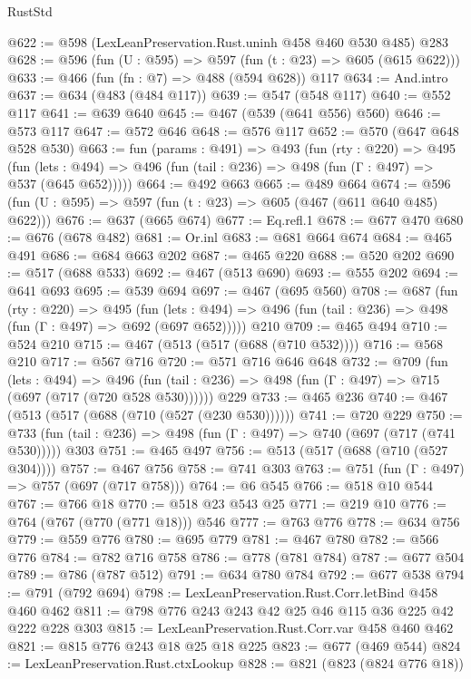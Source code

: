 \begin{lexlean}{RustStd}
\begin{coremodule}
@622 := @598 (LexLeanPreservation.Rust.uninh @458 @460 @530 @485) @283
@628 := @596 (fun (U : @595) => @597 (fun (t : @23) => @605 (@615 @622)))
@633 := @466 (fun (fn : @7) => @488 (@594 @628)) @117
@634 := And.intro
@637 := @634 (@483 (@484 @117))
@639 := @547 (@548 @117)
@640 := @552 @117
@641 := @639 @640
@645 := @467 (@539 (@641 @556) @560)
@646 := @573 @117
@647 := @572 @646
@648 := @576 @117
@652 := @570 (@647 @648 @528 @530)
@663 := fun (params : @491) =>
  @493
    (fun (rty : @220) =>
    @495
      (fun (lets : @494) => @496 (fun (tail : @236) => @498 (fun (Γ : @497) => @537 (@645 @652)))))
@664 := @492 @663
@665 := @489 @664
@674 := @596 (fun (U : @595) => @597 (fun (t : @23) => @605 (@467 (@611 @640 @485) @622)))
@676 := @637 (@665 @674)
@677 := Eq.refl.{1}
@678 := @677 @470
@680 := @676 (@678 @482)
@681 := Or.inl
@683 := @681 @664 @674
@684 := @465 @491
@686 := @684 @663 @202
@687 := @465 @220
@688 := @520 @202
@690 := @517 (@688 @533)
@692 := @467 (@513 @690)
@693 := @555 @202
@694 := @641 @693
@695 := @539 @694
@697 := @467 (@695 @560)
@708 := @687
    (fun (rty : @220) =>
    @495
      (fun (lets : @494) => @496 (fun (tail : @236) => @498 (fun (Γ : @497) => @692 (@697 @652)))))
    @210
@709 := @465 @494
@710 := @524 @210
@715 := @467 (@513 (@517 (@688 (@710 @532))))
@716 := @568 @210
@717 := @567 @716
@720 := @571 @716 @646 @648
@732 := @709
    (fun (lets : @494) =>
    @496 (fun (tail : @236) => @498 (fun (Γ : @497) => @715 (@697 (@717 (@720 @528 @530))))))
    @229
@733 := @465 @236
@740 := @467 (@513 (@517 (@688 (@710 (@527 (@230 @530))))))
@741 := @720 @229
@750 := @733 (fun (tail : @236) => @498 (fun (Γ : @497) => @740 (@697 (@717 (@741 @530))))) @303
@751 := @465 @497
@756 := @513 (@517 (@688 (@710 (@527 @304))))
@757 := @467 @756
@758 := @741 @303
@763 := @751 (fun (Γ : @497) => @757 (@697 (@717 @758)))
@764 := @6 @545
@766 := @518 @10 @544
@767 := @766 @18
@770 := @518 @23 @543 @25
@771 := @219 @10
@776 := @764 (@767 (@770 (@771 @18))) @546
@777 := @763 @776
@778 := @634 @756
@779 := @559 @776
@780 := @695 @779
@781 := @467 @780
@782 := @566 @776
@784 := @782 @716 @758
@786 := @778 (@781 @784)
@787 := @677 @504
@789 := @786 (@787 @512)
@791 := @634 @780 @784
@792 := @677 @538
@794 := @791 (@792 @694)
@798 := LexLeanPreservation.Rust.Corr.letBind @458 @460 @462
@811 := @798 @776 @243 @243 @42 @25 @46 @115 @36 @225 @42 @222 @228 @303
@815 := LexLeanPreservation.Rust.Corr.var @458 @460 @462
@821 := @815 @776 @243 @18 @25 @18 @225
@823 := @677 (@469 @544)
@824 := LexLeanPreservation.Rust.ctxLookup
@828 := @821 (@823 (@824 @776 @18))

\end{coremodule}
\end{lexlean}
